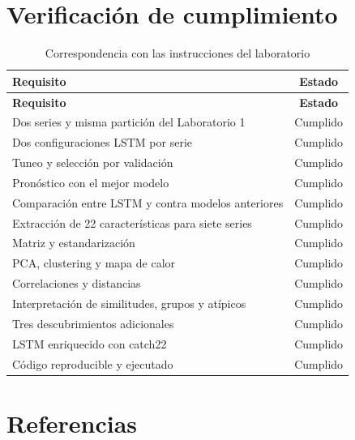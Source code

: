 \documentclass[11pt,letterpaper]{article}
\begin{document}
\section{Verificación de cumplimiento}

\begin{longtable}{p{10.8cm}c}
\caption{Correspondencia con las instrucciones del laboratorio}\\
\toprule
\textbf{Requisito} & \textbf{Estado}\\
\midrule
\endfirsthead
\toprule
\textbf{Requisito} & \textbf{Estado}\\
\midrule
\endhead
Dos series y misma partición del Laboratorio 1 & Cumplido\\
Dos configuraciones LSTM por serie & Cumplido\\
Tuneo y selección por validación & Cumplido\\
Pronóstico con el mejor modelo & Cumplido\\
Comparación entre LSTM y contra modelos anteriores & Cumplido\\
Extracción de 22 características para siete series & Cumplido\\
Matriz y estandarización & Cumplido\\
PCA, clustering y mapa de calor & Cumplido\\
Correlaciones y distancias & Cumplido\\
Interpretación de similitudes, grupos y atípicos & Cumplido\\
Tres descubrimientos adicionales & Cumplido\\
LSTM enriquecido con catch22 & Cumplido\\
Código reproducible y ejecutado & Cumplido\\
\bottomrule
\end{longtable}

\vspace{8cm}

\section*{Referencias}
\end{document}
